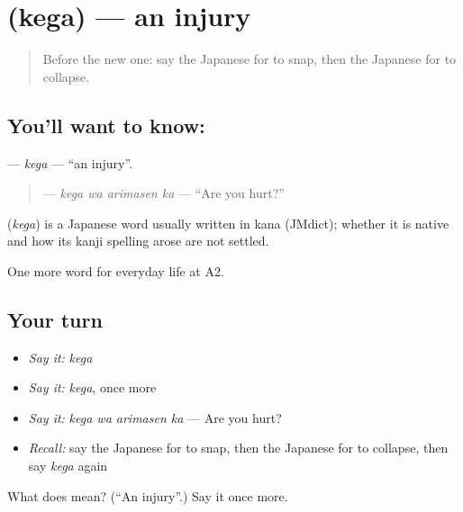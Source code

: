 \section[\texorpdfstring{\ja{けが} (kega)}{けが (kega)}]{ (kega) — an injury}

\label{lesson:JA-C219-kega}



\begin{quote}
Before the new one: say the Japanese for to snap, then the Japanese for to collapse.
\end{quote}

\subsection*{You'll want to know: }
\textbf{} — \emph{kega} — \textquotedblleft{}an injury\textquotedblright{}.

\begin{quote}
\textbf{ } — \emph{kega wa arimasen ka} — \textquotedblleft{}Are you hurt?\textquotedblright{}
\end{quote}

\begin{cousinweb}
\textbf{} (\emph{kega}) is a Japanese word usually written in kana (JMdict); whether it is native and how its kanji spelling arose are not settled.
\end{cousinweb}

\begin{grammarlens}[title={What you've built}]
One more word for everyday life at A2.
\end{grammarlens}

\subsection*{Your turn}
\begin{itemize}
\raggedright
  \item \emph{Say it:} \emph{kega}
  \item \emph{Say it:} \emph{kega}, once more
  \item \emph{Say it:} \emph{kega wa arimasen ka} — Are you hurt?
  \item \emph{Recall:} say the Japanese for to snap, then the Japanese for to collapse, then say \emph{kega} again
\end{itemize}

\begin{tcolorbox}[breakable,colback=teal!4,colframe=teal!35!black,title={Before you move on}]
What does  mean? (\textquotedblleft{}An injury\textquotedblright{}.) Say it once more.
\end{tcolorbox}
